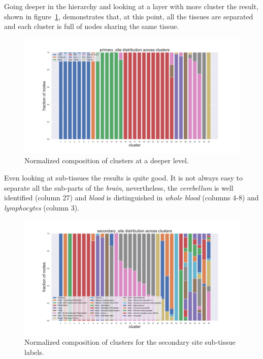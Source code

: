 Going deeper in the hierarchy and looking at a layer with more cluster the result, shown in figure~\ref{fig:topic/gtex/oversigma_10tissue/fraction_clustercomposition_l2_primary_site}, demonstrates that, at this point, all the tissues are separated and each cluster is full of nodes sharing the same tissue.
\begin{figure}[htb!]
    \centering
    \includegraphics[width=0.9\linewidth]{pictures/topic/gtex/oversigma_10tissue/fraction_clustercomposition_l2_primary_site.pdf}
    \caption{Normalized composition of clusters at a deeper level.}
    \label{fig:topic/gtex/oversigma_10tissue/fraction_clustercomposition_l2_primary_site}
\end{figure}
Even looking at sub-tissues the results is quite good. It is not always easy to separate all the sub-parts of the \textit{brain}, nevertheless, the \textit{cerebellum} is well identified (column 27) and \textit{blood} is distinguished in \textit{whole blood} (columns 4-8) and \textit{lymphocytes} (column 3).
\begin{figure}[htb!]
    \centering
    \includegraphics[width=0.9\linewidth]{pictures/topic/gtex/oversigma_10tissue/fraction_clustercomposition_l2_secondary_site.pdf}
    \caption{Normalized composition of clusters for the secondary site sub-tissue labels.}
    \label{fig:topic/gtex/oversigma_10tissue/fraction_clustercomposition_l2_secondary_site}
\end{figure}

